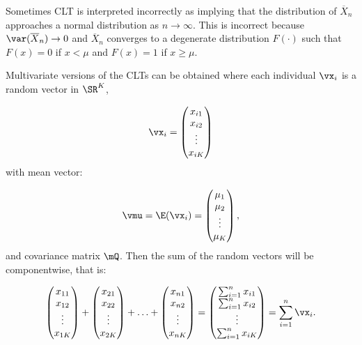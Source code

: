 \documentclass[english,12pt]{book}\usepackage[]{graphicx}\usepackage[]{xcolor}
\begin{document}
\begin{remark}
  Sometimes CLT is interpreted incorrectly as implying that the distribution of $\overline{X}_n$ approaches a normal distribution as $n\to \infty$. This is incorrect because $\var(\overline{X}_n)\to 0$ and $\overline{X}_n$ converges to a degenerate distribution $F(\cdot)$ such that $F(x) = 0$ if $x < \mu$ and $F(x) = 1$ if $x\geq \mu$.
\end{remark}

Multivariate versions of the CLTs can be obtained where each individual $\vx_i$ is a random vector in $\SR^K$, 


\begin{equation*}
\vx_i =\begin{pmatrix}
        x_{i1}\\
        x_{i2} \\
        \vdots\\
        x_{iK}
      \end{pmatrix}  
\end{equation*}
%
with mean vector:

\begin{equation*}
\vmu = \E(\vx_i) = \begin{pmatrix}
          \mu_1 \\
          \mu_2 \\
          \vdots \\
          \mu_K
       \end{pmatrix},
\end{equation*}
%
and covariance matrix $\mQ$. Then the sum of the random vectors will be componentwise, that is:

\begin{equation*}
\begin{pmatrix}
        x_{11}\\
        x_{12} \\
        \vdots\\
        x_{1K}
      \end{pmatrix} +
\begin{pmatrix}
        x_{21}\\
        x_{22} \\
        \vdots\\
        x_{2K}
      \end{pmatrix}+
\hdots +
\begin{pmatrix}
        x_{n1}\\
        x_{n2} \\
        \vdots\\
        x_{nK}
      \end{pmatrix} =
\begin{pmatrix}
\sum_{i = 1}^n x_{i1} \\
\sum_{i = 1}^n x_{i2} \\
\vdots \\
\sum_{i = 1}^n x_{iK}
\end{pmatrix}=
\sum_{i = 1}^n\vx_i.
\end{equation*}
\end{document}
